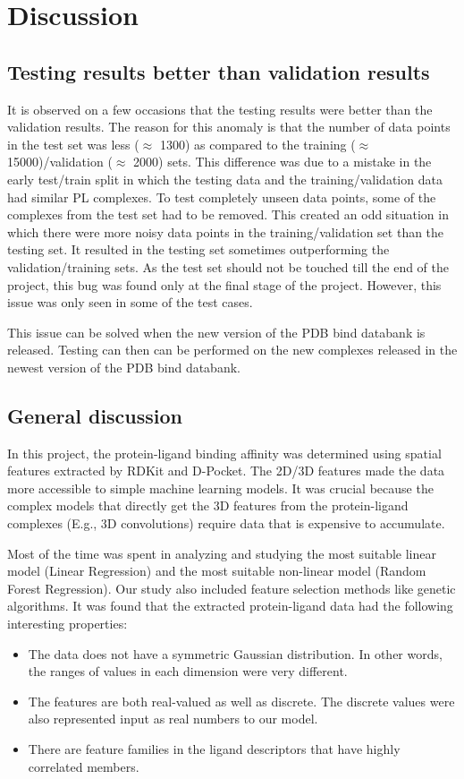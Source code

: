 \documentclass[11pt]{article}
\begin{document}
\section{Discussion}

\subsection{Testing results better than validation results}
\label{testingissuesection}
It is observed on a few occasions that the testing results were better than the validation results. The reason for this anomaly is that the number of data points in the test set was less ($\approx$ 1300) as compared to the training ($\approx$ 15000)/validation ($\approx$ 2000) sets. This difference was due to a mistake in the early test/train split in which the testing data and the training/validation data had similar PL complexes. To test completely unseen data points, some of the complexes from the test set had to be removed. This created an odd situation in which there were more noisy data points in the training/validation set than the testing set. It resulted in the testing set sometimes outperforming the validation/training sets. As the test set should not be touched till the end of the project, this bug was found only at the final stage of the project.
However, this issue was only seen in some of the test cases.

This issue can be solved when the new version of the PDB bind databank is released. Testing can then can be performed on the new complexes released in the newest version of the PDB bind databank.

\subsection{General discussion}
In this project, the protein-ligand binding affinity was determined using spatial features extracted by RDKit and D-Pocket.
The 2D/3D features made the data more accessible to simple machine learning models. 
It was crucial because the complex models that directly get the 3D features from the protein-ligand complexes (E.g., 3D convolutions) require data that is expensive to accumulate.

Most of the time was spent in analyzing and studying the most suitable linear model (Linear Regression) and the most suitable non-linear model (Random Forest Regression).
Our study also included feature selection methods like genetic algorithms.
It was found that the extracted protein-ligand data had the following interesting properties:
\begin{itemize}
\item The data does not have a symmetric Gaussian distribution.  In other words, the ranges of values in each dimension were very different.
\item The features are both real-valued as well as discrete.  The discrete values were also represented input as real numbers to our model.
\item There are feature families in the ligand descriptors that have highly correlated members.
\end{itemize}
\end{document}
